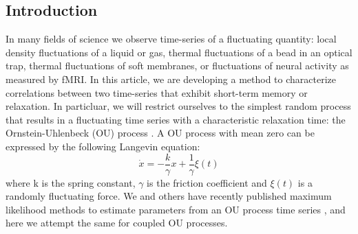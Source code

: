 \documentclass[%
 reprint,
 amsmath,amssymb,
 aps,
]{revtex4-1}
\begin{document}
\onecolumngrid
\subsection{Introduction}
In many fields of science we observe time-series of a fluctuating quantity: local density fluctuations of a liquid or gas, thermal fluctuations of a bead in an optical trap, thermal fluctuations of soft membranes, or fluctuations of neural activity as measured by fMRI.  In this article, we are developing a method to characterize correlations between two time-series that exhibit short-term memory or relaxation.  In particluar, we will restrict ourselves to the simplest random process that results in a fluctuating time series with a characteristic relaxation time: the Ornstein-Uhlenbeck (OU) process \cite{RN28}.  A OU process with mean zero can be expressed by the following Langevin equation:
\begin{equation}
\dot x =  - \frac{k}{\gamma }x + \frac{1}{\gamma }\xi(t)
\label{model}
\end{equation}
where k is the spring constant, $\gamma$ is the friction coefficient and $\xi(t)$ is a randomly fluctuating force.  
We and others have recently published maximum likelihood methods to estimate parameters from an OU process time series \cite{RN91,RN51,RN62}, and here we attempt the same for coupled OU processes.
\end{document}
